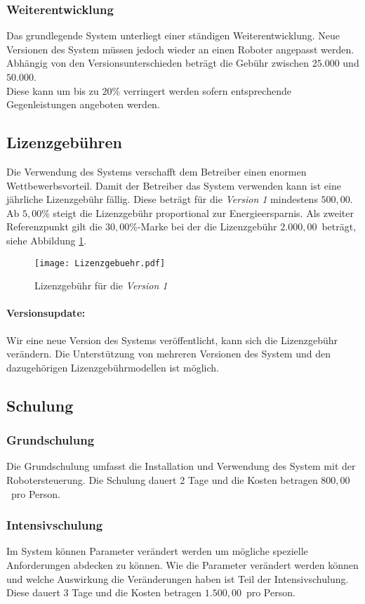 \subsubsection{Weiterentwicklung}
Das grundlegende System unterliegt einer ständigen Weiterentwicklung. Neue Versionen des System müssen jedoch wieder an einen Roboter angepasst werden. Abhängig von den Versionsunterschieden beträgt die Gebühr zwischen $25.000$ und $50.000$\officialeuro.\\
Diese kann um bis zu $20$\% verringert werden sofern entsprechende Gegenleistungen angeboten werden.

\subsection{Lizenzgebühren}
Die Verwendung des Systems verschafft dem Betreiber einen enormen Wettbewerbsvorteil. Damit der Betreiber das System verwenden kann ist eine jährliche Lizenzgebühr fällig. Diese beträgt für die \textit{Version 1} mindestens $500,00$\officialeuro. Ab $5,00$\% steigt die Lizenzgebühr proportional zur Energieersparnis. Als zweiter Referenzpunkt gilt die $30,00$\%-Marke bei der die Lizenzgebühr $2.000,00$\officialeuro~beträgt, siehe Abbildung \ref{fig:lizenzgebuehr}.
\begin{figure}[h]
	\centering
	\texttt{[image: Lizenzgebuehr.pdf]}
	\caption{Lizenzgebühr für die \textit{Version 1}}
	\label{fig:lizenzgebuehr}
\end{figure}

\paragraph*{Versionsupdate:}
Wir eine neue Version des Systems veröffentlicht, kann sich die Lizenzgebühr verändern. Die Unterstützung von mehreren Versionen des System und den dazugehörigen Lizenzgebührmodellen ist möglich.

\subsection{Schulung}
\subsubsection{Grundschulung}
Die Grundschulung umfasst die Installation und Verwendung des System mit der Robotersteuerung. Die Schulung dauert 2 Tage und die Kosten betragen $800,00$\officialeuro~pro Person.

\subsubsection{Intensivschulung}
Im System können Parameter verändert werden um mögliche spezielle Anforderungen abdecken zu können. Wie die Parameter verändert werden können und welche Auswirkung die Veränderungen haben ist Teil der Intensivschulung. Diese dauert 3 Tage und die Kosten betragen $1.500,00$\officialeuro~pro Person.

